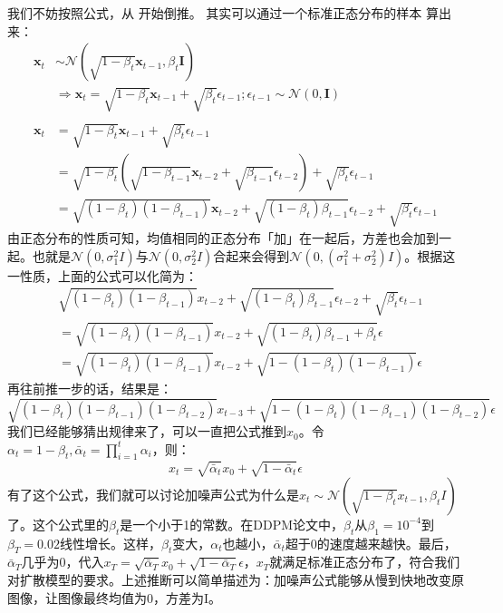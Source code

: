 \documentclass[]{report}
\begin{document}
我们不妨按照公式，从
开始倒推。
其实可以通过一个标准正态分布的样本
算出来：
\[
\begin{aligned}
	\mathbf{x}_t &\sim \mathcal{N}(\sqrt{1 - \beta_t}\mathbf{x}_{t-1}, \beta_t \mathbf{I}) \\
	&\Rightarrow \mathbf{x}_t = \sqrt{1 - \beta_t} \mathbf{x}_{t-1} + \sqrt{\beta_t} \epsilon_{t-1}; \epsilon_{t-1} \sim \mathcal{N}(0, \mathbf{I}) \\
	\\
	\mathbf{x}_t &= \sqrt{1 - \beta_t} \mathbf{x}_{t-1} + \sqrt{\beta_t} \epsilon_{t-1} \\
	&= \sqrt{1 - \beta_t}(\sqrt{1 - \beta_{t-1}}\mathbf{x}_{t-2} + \sqrt{\beta_{t-1}} \epsilon_{t-2}) + \sqrt{\beta_t} \epsilon_{t-1} \\
	&= \sqrt{(1 - \beta_t)(1 - \beta_{t-1})} \mathbf{x}_{t-2} + \sqrt{(1 - \beta_t)\beta_{t-1}} \epsilon_{t-2} + \sqrt{\beta_t} \epsilon_{t-1}
\end{aligned}
\]
由正态分布的性质可知，均值相同的正态分布「加」在一起后，方差也会加到一起。也就是\(\mathcal{N}(0, \sigma_1^2I)\)与\(\mathcal{N}(0, \sigma_2^2I)\)合起来会得到\(\mathcal{N}(0, (\sigma_1^2 + \sigma_2^2)I)\)。根据这一性质，上面的公式可以化简为：
\[
\begin{aligned}
&\sqrt{(1-\beta_t)(1-\beta_{t-1})}x_{t-2} + \sqrt{(1-\beta_t)\beta_{t-1}}\epsilon_{t-2} + \sqrt{\beta_t}\epsilon_{t-1}\\
&= \sqrt{(1-\beta_t)(1-\beta_{t-1})}x_{t-2} + \sqrt{(1-\beta_t)\beta_{t-1} + \beta_t}\epsilon\\
&= \sqrt{(1-\beta_t)(1-\beta_{t-1})}x_{t-2} + \sqrt{1-(1-\beta_t)(1-\beta_{t-1})}\epsilon
\end{aligned}
\]
再往前推一步的话，结果是：
\[
\sqrt{(1-\beta_t)(1-\beta_{t-1})(1-\beta_{t-2})}x_{t-3} + \sqrt{1-(1-\beta_t)(1-\beta_{t-1})(1-\beta_{t-2})}\epsilon
\]
我们已经能够猜出规律来了，可以一直把公式推到\(x_0\)。令\(\alpha_t = 1-\beta_t, \bar{\alpha}_t = \prod_{i=1}^t \alpha_i\)，则：
\[
x_t = \sqrt{\bar{\alpha}_t}x_0 + \sqrt{1-\bar{\alpha}_t}\epsilon
\]
有了这个公式，我们就可以讨论加噪声公式为什么是\(x_t \sim \mathcal{N}(\sqrt{1-\beta_t}x_{t-1}, \beta_tI)\)了。这个公式里的\(\beta_t\)是一个小于1的常数。在DDPM论文中，\(\beta_t\)从\(\beta_1 = 10^{-4}\)到\(\beta_T = 0.02\)线性增长。这样，\(\beta_t\)变大，\(\alpha_t\)也越小，\(\bar{\alpha}_t\)超于0的速度越来越快。最后，\(\bar{\alpha}_T\)几乎为0，代入\(x_T = \sqrt{\bar{\alpha}_T}x_0 + \sqrt{1-\bar{\alpha}_T}\epsilon\)，\(x_T\)就满足标准正态分布了，符合我们对扩散模型的要求。上述推断可以简单描述为：加噪声公式能够从慢到快地改变原图像，让图像最终均值为0，方差为I。
\end{document}
